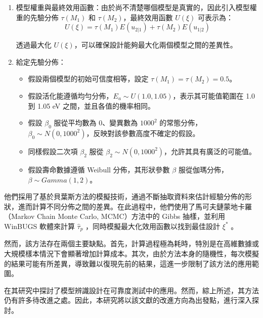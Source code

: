 \begin{enumerate}
\item 模型權重與最終效用函數：由於尚不清楚哪個模型是真實的，因此引入模型權重的先驗分佈 $\tau(M_1)$ 和 $\tau(M_2)$，最終效用函數 $U(\xi)$ 可表示為：
\begin{equation}
U(\xi)=\tau(M_1)E(u_{2|1})+\tau(M_2)E(u_{1|2})
\end{equation}

透過最大化 $U(\xi)$，可以確保設計能夠最大化兩個模型之間的差異性。

\item 給定先驗分佈：

\begin{itemize}

\item 假設兩個模型的初始可信度相等，設定 $\tau(M_1) = \tau(M_2) = 0.5$。
\item 假設活化能遵循均勻分佈，$E_a \sim U(1.0, 1.05)$，表示其可能值範圍在 1.0 到 1.05 eV 之間，並且各值的機率相同。
\item 假設 $\beta_0$ 服從平均數為 0、變異數為 $1000^2$ 的常態分佈，$\beta_0 \sim N(0, 1000^2)$，反映對該參數高度不確定的假設。
\item 同樣假設二次項 $\beta_2$ 服從 $\beta_2 \sim N(0, 1000^2)$，允許其具有廣泛的可能值。
\item 假設壽命數據遵循 Weibull 分佈，其形狀參數 $\beta$ 服從伽瑪分佈，$\beta \sim Gamma(1,2)$。

\end{itemize}

\end{enumerate}

\hspace*{8mm} 他們採用了基於貝葉斯方法的模擬技術，通過不斷抽取資料來估計經驗分佈的形狀，進而計算不同分佈之間的差異。在此過程中，他們使用了馬可夫鏈蒙地卡羅（Markov Chain Monte Carlo, MCMC）方法中的 Gibbs 抽樣，並利用 WinBUGS 軟體來計算 $\hat{\tau}_p$ ，同時模擬最大化效用函數以找到最佳設計 $\xi^*$ 。

\hspace*{8mm} 然而，該方法存在兩個主要缺點。首先，計算過程極為耗時，特別是在高維數據或大規模樣本情況下會顯著增加計算成本。其次，由於方法本身的隨機性，每次模擬的結果可能有所差異，導致難以復現先前的結果，這進一步限制了該方法的應用範圍。

\hspace*{8mm} \cite{nasir2015simulation} 在其研究中探討了模型辨識設計在可靠度測試中的應用。然而，綜上所述，其方法仍有許多待改進之處。因此，本研究將以該文獻的改進方向為出發點，進行深入探討。